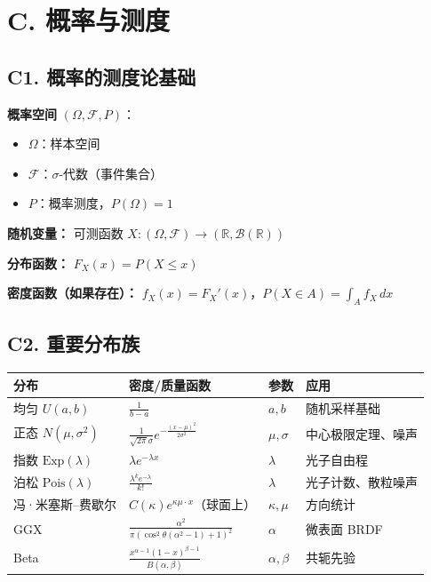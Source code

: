 \section{C. 概率与测度}

\subsection{C1. 概率的测度论基础}

\textbf{概率空间} $(\Omega, \mathcal{F}, P)$：
\begin{itemize}
  \item $\Omega$：样本空间
  \item $\mathcal{F}$：$\sigma$-代数（事件集合）
  \item $P$：概率测度，$P(\Omega) = 1$
\end{itemize}

\textbf{随机变量：} 可测函数 $X: (\Omega, \mathcal{F}) \to (\mathbb{R}, \mathcal{B}(\mathbb{R}))$

\textbf{分布函数：} $F_X(x) = P(X \leq x)$

\textbf{密度函数（如果存在）：} $f_X(x) = F_X'(x)$，$P(X \in A) = \int_A f_X\,dx$

\subsection{C2. 重要分布族}

\begin{center}
\begin{tabular}{p{3cm}p{5cm}p{2cm}p{3.5cm}}
\toprule
\textbf{分布} & \textbf{密度/质量函数} & \textbf{参数} & \textbf{应用} \\
\midrule
均匀 $U(a,b)$ & $\frac{1}{b-a}$ & $a, b$ & 随机采样基础 \\
正态 $N(\mu, \sigma^2)$ & $\frac{1}{\sqrt{2\pi}\sigma}e^{-\frac{(x-\mu)^2}{2\sigma^2}}$ & $\mu, \sigma$ & 中心极限定理、噪声 \\
指数 $\text{Exp}(\lambda)$ & $\lambda e^{-\lambda x}$ & $\lambda$ & 光子自由程 \\
泊松 $\text{Pois}(\lambda)$ & $\frac{\lambda^k e^{-\lambda}}{k!}$ & $\lambda$ & 光子计数、散粒噪声 \\
冯·米塞斯--费歇尔 & $C(\kappa)e^{\kappa \mu \cdot x}$（球面上） & $\kappa, \mu$ & 方向统计 \\
GGX & $\frac{\alpha^2}{\pi(\cos^2\theta(\alpha^2-1)+1)^2}$ & $\alpha$ & 微表面 BRDF \\
Beta & $\frac{x^{\alpha-1}(1-x)^{\beta-1}}{B(\alpha,\beta)}$ & $\alpha, \beta$ & 共轭先验 \\
\bottomrule
\end{tabular}
\end{center}

